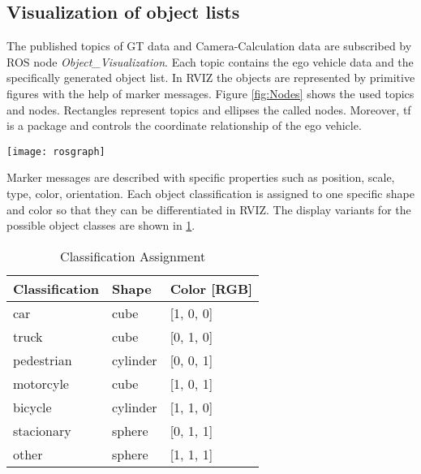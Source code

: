 \subsection{Visualization of object lists}

The published topics of \ac{GT} data and Camera-Calculation data are subscribed by \ac{ROS} node \textit{Object\_Visualization}. Each topic contains the ego vehicle data and the specifically generated object list. In \ac{RVIZ} the objects are represented by primitive figures with the help of marker messages. Figure \ref{fig:Nodes} shows the used topics and nodes. Rectangles represent topics and ellipses the called nodes. Moreover, tf is a package and controls the coordinate relationship of the ego vehicle.
\begin{figure*}[thpb]
	\centering
	\texttt{[image: rosgraph]}
	\caption{Nodes (ellipses)/ Topics (rectangles) in \ac{ROS}}
	\label{fig:Nodes}
\end{figure*}
Marker messages are described with specific properties such as position, scale, type, color, orientation. Each object classification is assigned to one specific shape and color so that they can be differentiated in \ac{RVIZ}. The display variants for the possible object classes are shown in \cref{ClassificationAssignment}. 
\begin{table}[h]
	\caption{Classification Assignment}
	\begin{tabularx}{\columnwidth}{XXX}
		\toprule
		Classification & Shape & Color [RGB]\\
		\toprule
		car & cube & [1, 0, 0]\\
		truck & cube & [0, 1, 0]\\
		pedestrian & cylinder & [0, 0, 1]\\
		motorcyle & cube & [1, 0, 1]\\
		bicycle & cylinder & [1, 1, 0]\\
		stacionary & sphere & [0, 1, 1]\\
		other & sphere & [1, 1, 1]\\
		\bottomrule
	\end{tabularx}
	\label{ClassificationAssignment}
\end{table}

